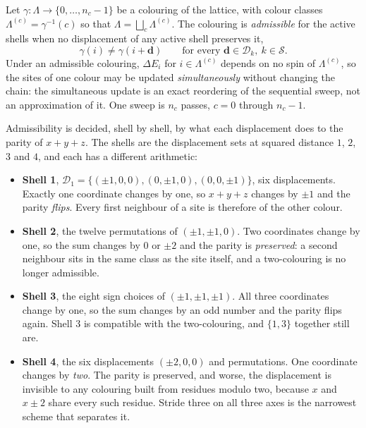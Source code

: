 \documentclass[11pt,a4paper]{article}
\newcommand{\vd}{\mathbf{d}}
\newcommand{\shells}{\mathcal{S}}
\begin{document}
Let $\gamma : \Lambda \to \{0, \dots, n_c - 1\}$ be a colouring of the lattice,
with colour classes $\Lambda^{(c)} = \gamma^{-1}(c)$ so that
$\Lambda = \bigsqcup_{c} \Lambda^{(c)}$. The colouring is \emph{admissible} for
the active shells when no displacement of any active shell preserves it,
%
\begin{equation}
\gamma(i) \neq \gamma(i + \vd)
\qquad \text{for every } \vd \in \mathcal{D}_k, \ k \in \shells .
\label{eq:admissible}
\end{equation}
%
Under an admissible colouring, $\Delta E_i$ for $i \in \Lambda^{(c)}$ depends on
no spin of $\Lambda^{(c)}$, so the sites of one colour may be updated
\emph{simultaneously} without changing the chain: the simultaneous update is an
exact reordering of the sequential sweep, not an approximation of it. One sweep
is $n_c$ passes, $c = 0$ through $n_c - 1$.

Admissibility is decided, shell by shell, by what each displacement does to the
parity of $x+y+z$. The shells are the displacement sets at squared distance
$1$, $2$, $3$ and $4$, and each has a different arithmetic:

\begin{itemize}
\item \textbf{Shell 1}, $\mathcal{D}_1 = \{(\pm 1,0,0),(0,\pm 1,0),
      (0,0,\pm 1)\}$, six displacements. Exactly one coordinate changes by one,
      so $x+y+z$ changes by $\pm 1$ and the parity \emph{flips}. Every first
      neighbour of a site is therefore of the other colour.
\item \textbf{Shell 2}, the twelve permutations of $(\pm 1, \pm 1, 0)$. Two
      coordinates change by one, so the sum changes by $0$ or $\pm 2$ and the
      parity is \emph{preserved}: a second neighbour sits in the same class as
      the site itself, and a two-colouring is no longer admissible.
\item \textbf{Shell 3}, the eight sign choices of $(\pm 1, \pm 1, \pm 1)$. All
      three coordinates change by one, so the sum changes by an odd number and
      the parity flips again. Shell 3 is compatible with the two-colouring, and
      $\{1,3\}$ together still are.
\item \textbf{Shell 4}, the six displacements $(\pm 2,0,0)$ and permutations.
      One coordinate changes by \emph{two}. The parity is preserved, and worse,
      the displacement is invisible to any colouring built from residues
      modulo two, because $x$ and $x \pm 2$ share every such residue. Stride
      three on all three axes is the narrowest scheme that separates it.
\end{itemize}
\end{document}

